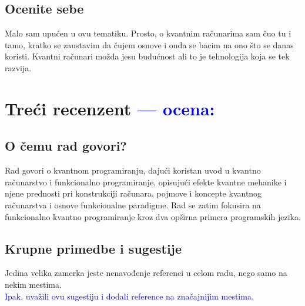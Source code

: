 \documentclass[a4paper]{report}
\newcommand{\odgovor}[1]{\textcolor{blue}{#1}}
\begin{document}
\section{Ocenite sebe}

Malo sam upućen u ovu tematiku. Prosto, o kvantnim računarima sam čuo tu i tamo, 
kratko se zaustavim da čujem osnove i onda se bacim na ono što se danas koristi. 
Kvantni računari možda jesu budućnost ali to je tehnologija koja se tek razvija. 



\chapter{Treći recenzent \odgovor{--- ocena:} }

\section{O čemu rad govori?}
Rad govori o kvantnom programiranju, dajući koristan uvod u kvantno računarstvo i funkcionalno programiranje, opisujući efekte kvantne mehanike i njene prednosti pri konstrukciji računara, pojmove i koncepte kvantnog računarstva i osnove funkcionalne paradigme. Rad se zatim fokusira na funkcionalno kvantno programiranje kroz dva opširna primera programskih jezika.

\section{Krupne primedbe i sugestije}
Jedina velika zamerka jeste nenavođenje referenci u celom radu, nego samo na nekim mestima. \\
\odgovor { Ipak, uvažili ovu sugestiju i dodali reference na značajnijim mestima.}

\end{document}

